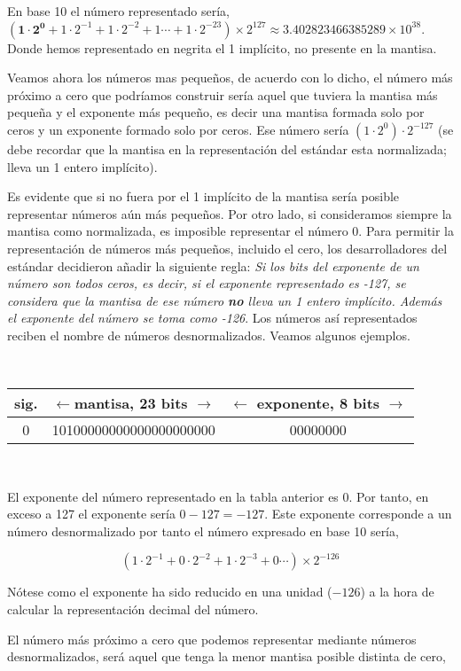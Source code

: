 \begin{paracol}{2}
En base 10 el número representado sería, $(\mathbf{1\cdot2^0}+1\cdot2^{-1}+1\cdot2^{-2}+1\cdots+1\cdot2^{-23})\times2^{127}\approx 3.402823466385289\times10^{38}$. Donde hemos representado en negrita el 1 implícito, no presente en la mantisa.
 
Veamos ahora los números mas pequeños, de acuerdo con lo dicho, el número más próximo a cero que podríamos construir sería aquel que tuviera la mantisa más pequeña y el exponente más pequeño, es decir una mantisa formada solo por ceros y un exponente formado solo por ceros. Ese número sería $(1\cdot 2^0)\cdot2^{-127}$ (se debe recordar que la mantisa en la representación del estándar esta normalizada; lleva un 1 entero implícito). 

 Es evidente que si no fuera por el 1 implícito de la mantisa sería posible representar números aún más pequeños. Por otro lado, si consideramos siempre la mantisa como normalizada, es imposible representar el número 0. Para permitir la representación de números más pequeños, incluido el cero, los desarrolladores del estándar decidieron añadir la siguiente regla: \emph{Si los bits del exponente de un número son todos ceros, es decir, si el exponente representado es -127, se considera que la mantisa de ese número \textbf{no} lleva un 1 entero implícito. Además el  exponente del número se toma como -126}. Los números así representados reciben el nombre de números desnormalizados. Veamos algunos ejemplos.
\end{paracol}
\ \\

\begin{tabular}{|c||c||c|}
\hline
sig.&$\leftarrow$mantisa, 23 bits $\rightarrow$&$\leftarrow$ exponente, 8 bits $\rightarrow$\\
\hline
0&10100000000000000000000&00000000\\
\hline
\end{tabular}\\

\begin{paracol}{2}
El exponente del número representado en la tabla anterior es 0. Por tanto, en exceso a 127 el exponente sería $0-127=-127$. Este exponente corresponde a un número desnormalizado por tanto el número expresado en base 10 sería,
\end{paracol}
\begin{equation*}
(1\cdot 2^{-1}+ 0\cdot 2^{-2}+1\cdot2^{-3}+0\cdots)\times2^{-126}
\end{equation*}
\begin{paracol}{2}
Nótese como el exponente ha sido reducido en una unidad ($-126$) a la hora de calcular la representación decimal del número.

 El número más próximo a cero que podemos representar mediante números desnormalizados, será aquel que tenga la menor mantisa posible distinta de cero,\\ 
\end{paracol}


